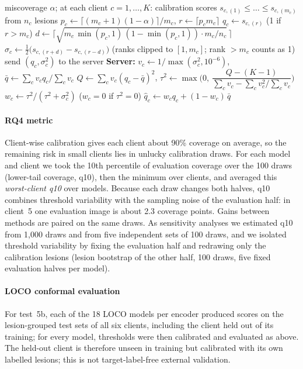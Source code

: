 \documentclass[VANCOUVER,Times1COL]{WileyNJDv5}
\begin{document}
\begin{algorithm}[!t]
\caption{EB-ShrinkFCP: per-client conformal thresholds with empirical-Bayes shrinkage.}
\label{alg:eb}
\begin{algorithmic}[1]
\Require miscoverage $\alpha$; at each client $c=1,\dots,K$: calibration scores $s_{c,(1)}\le\dots\le s_{c,(m_c)}$ from $n_c$ lesions
  \State $p_c \gets \lceil (m_c+1)(1-\alpha)\rceil/m_c$, \quad $r \gets \lceil p_c m_c\rceil$
  \State $q_c \gets s_{c,(r)}$ \quad (1 if $r>m_c$)
  \State $d \gets \big\lceil \sqrt{m_c\,\min(p_c,1)\,(1-\min(p_c,1))\cdot m_c/n_c}\,\big\rceil$
  \State $\sigma_c \gets \tfrac12\big(s_{c,(r+d)}-s_{c,(r-d)}\big)$ \quad (ranks clipped to $[1,m_c]$; rank $>m_c$ counts as 1)
  \State send $(q_c,\sigma_c^2)$ to the server
\EndFor
\State \textbf{Server:} $v_c \gets 1/\max(\sigma_c^2,10^{-6})$, \quad $\bar q \gets \sum_c v_c q_c / \sum_c v_c$
\State $Q \gets \sum_c v_c (q_c-\bar q)^2$, \quad $\tau^2 \gets \max\!\Big(0,\ \dfrac{Q-(K-1)}{\sum_c v_c-\sum_c v_c^2/\sum_c v_c}\Big)$
  \State $w_c \gets \tau^2/(\tau^2+\sigma_c^2)$ \quad ($w_c=0$ if $\tau^2=0$)
  \State $\hat q_c \gets w_c q_c + (1-w_c)\,\bar q$ 
\EndFor
\end{algorithmic}
\end{algorithm}

\paragraph{RQ4 metric} Client-wise calibration gives each client about 90\% coverage on average, so the
remaining risk in small clients lies in unlucky calibration draws. For each model and client we took the
10th percentile of evaluation coverage over the 100 draws (lower-tail coverage, q10), then the minimum over
clients, and averaged this \emph{worst-client q10} over models. Because each draw changes both halves,
q10 combines threshold variability with the sampling noise of the evaluation half: in client~5 one
evaluation image is about 2.3 coverage points. Gains between methods are paired on the same draws. As
sensitivity analyses we estimated q10 from 1,000 draws and from five independent sets of 100 draws, and we
isolated threshold variability by fixing the evaluation half and redrawing only the calibration lesions
(lesion bootstrap of the other half, 100 draws, five fixed evaluation halves per model).

\paragraph{LOCO conformal evaluation} For test~5b, each of the 18 LOCO models per encoder produced scores on
the lesion-grouped test sets of all six clients, including the client held out of its training; for every
model, thresholds were then calibrated and evaluated as above. The held-out client is therefore unseen in
training but calibrated with its own labelled lesions; this is not target-label-free external validation.
\end{document}

